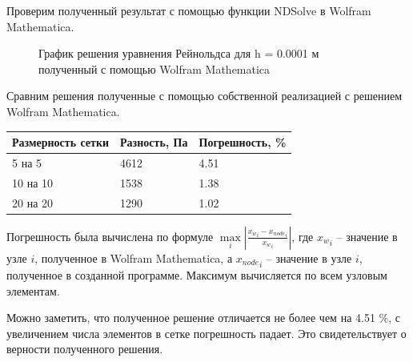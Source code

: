 \documentclass[a4paper,14pt]{extarticle}
\begin{document}
Проверим полученный результат с помощью функции NDSolve в Wolfram Mathematica.

\begin{figure}[!htbp]
	\caption{График решения уравнения Рейнольдса для h = 0.0001 м полученный с помощью Wolfram Mathematica}
	\label{exactSolutionConst}
\end{figure}

Сравним решения полученные с помощью собственной реализацией с решением Wolfram Mathematica.

\begin{table}[!htbp]
	\begin{tabular}{|l|l|l|}
		\hline
		\multicolumn{1}{|c|}{Размерность сетки} & \multicolumn{1}{c|}{Разность, Па} & Погрешность, \% \\ \hline
		5 на 5                                  & 4612                              & 4.51            \\ \hline
		10 на 10                                & 1538                              & 1.38            \\ \hline
		20 на 20                                & 1290                              & 1.02            \\ \hline
	\end{tabular}
\end{table}

Погрешность была вычислена по формуле $\underset{i}{\max} | \frac{{x_w}_i - {x_{node}}_i}{{x_w}_i} |$, где ${x_w}_i$ -- значение в узле $i$, полученное в Wolfram Mathematica, а ${x_{node}}_i$ -- значение в узле $i$, полученное в созданной программе. Максимум вычисляется по всем узловым элементам.

Можно заметить, что полученное решение отличается не более чем на 4.51 \%, с увеличением числа элементов в сетке погрешность падает. Это свидетельствует о верности полученного решения. 
\end{document}
